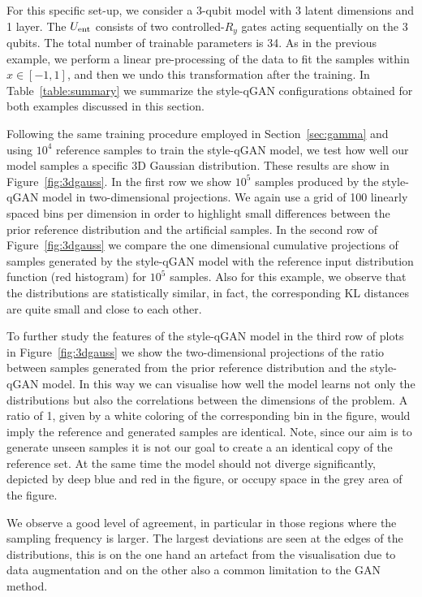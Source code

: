 \documentclass[twocolumn,preprintnumbers,superscriptaddress]{revtex4-2}
\begin{document}
For this specific set-up, we consider a 3-qubit model with 3 latent dimensions and
1 layer. The $U_{\rm ent}$ consists of two controlled-$R_{y}$ gates acting sequentially on the 3 qubits. The total number of trainable parameters is 34. As in the previous example, we perform a linear pre-processing of the data to fit the samples within $x \in [-1, 1]$, and then we undo this transformation after the training. In Table~\ref{table:summary}
we summarize the style-qGAN configurations obtained for both examples discussed in
this section.

Following the same training procedure employed in Section~\ref{sec:gamma} and using $10^4$ reference samples to train the style-qGAN model, we test how well our model samples a specific 3D Gaussian distribution. These results are show in Figure~\ref{fig:3dgauss}. In the first row we show $10^5$ samples produced by the
style-qGAN model in two-dimensional projections. We again use a
grid of 100 linearly spaced bins per dimension in order to highlight small
differences between the prior reference distribution and the artificial samples.
%
In the second row of Figure~\ref{fig:3dgauss} we compare the one dimensional
cumulative projections of samples generated by the style-qGAN model with the
reference input distribution function (red histogram) for $10^5$ samples. Also
for this example, we observe that the distributions are statistically similar,
in fact, the corresponding KL distances are quite small and close to each other.

To further study the features of the style-qGAN model in the third row of plots in Figure~\ref{fig:3dgauss} we show the two-dimensional projections of the ratio between samples generated from the prior reference distribution and the style-qGAN model.
In this way we can visualise how well the model learns not only the distributions but also the correlations between the dimensions of the problem. A ratio of 1, given by a white coloring of the corresponding bin in the figure, would imply the reference and generated samples are identical. Note, since our aim is to generate unseen samples it is not our goal to create a an identical copy of the reference set. At the same time the model should not diverge significantly, depicted by deep blue and red in the figure, or occupy space in the grey area of the figure. 

We observe a good level of agreement, in particular in those regions where the
sampling frequency is larger. The largest deviations are seen at the edges of the distributions, this is on the one hand an artefact from the visualisation due to data augmentation and on the other also a common limitation to the GAN method.
\end{document}
